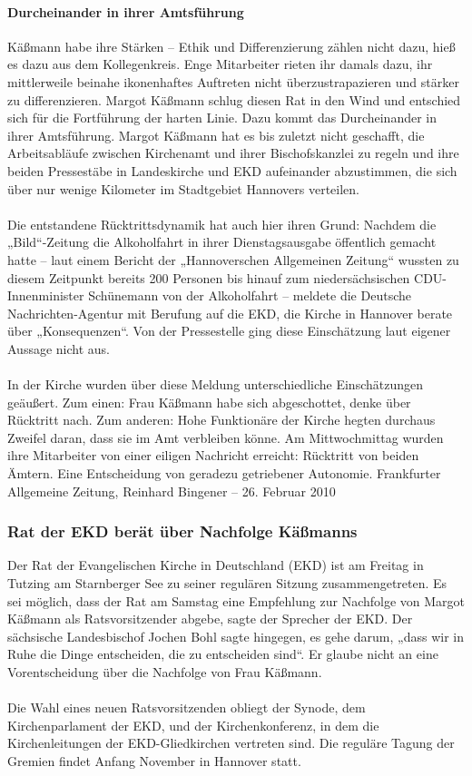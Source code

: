 \documentclass[a4paper,12pt,twoside]{scrbook}
\begin{document}
\paragraph{Durcheinander in ihrer Amtsführung}
Käßmann habe ihre Stärken – Ethik und Differenzierung zählen nicht dazu, hieß es dazu aus dem Kollegenkreis. Enge Mitarbeiter rieten ihr damals dazu, ihr mittlerweile beinahe ikonenhaftes Auftreten nicht überzustrapazieren und stärker zu differenzieren. Margot Käßmann schlug diesen Rat in den Wind und entschied sich für die Fortführung der harten Linie. Dazu kommt das Durcheinander in ihrer Amtsführung. Margot Käßmann hat es bis zuletzt nicht geschafft, die Arbeitsabläufe zwischen Kirchenamt und ihrer Bischofskanzlei zu regeln und ihre beiden Pressestäbe in Landeskirche und EKD aufeinander abzustimmen, die sich über nur wenige Kilometer im Stadtgebiet Hannovers verteilen.
\\\\
Die entstandene Rücktrittsdynamik hat auch hier ihren Grund: Nachdem die „Bild“-Zeitung die Alkoholfahrt in ihrer Dienstagsausgabe öffentlich gemacht hatte – laut einem Bericht der „Hannoverschen Allgemeinen Zeitung“ wussten zu diesem Zeitpunkt bereits 200 Personen bis hinauf zum niedersächsischen CDU-Innenminister Schünemann von der Alkoholfahrt – meldete die Deutsche Nachrichten-Agentur mit Berufung auf die EKD, die Kirche in Hannover berate über „Konsequenzen“. Von der Pressestelle ging diese Einschätzung laut eigener Aussage nicht aus.
\\\\
In der Kirche wurden über diese Meldung unterschiedliche Einschätzungen geäußert. Zum einen: Frau Käßmann habe sich abgeschottet, denke über Rücktritt nach. Zum anderen: Hohe Funktionäre der Kirche hegten durchaus Zweifel daran, dass sie im Amt verbleiben könne. Am Mittwochmittag wurden ihre Mitarbeiter von einer eiligen Nachricht erreicht: Rücktritt von beiden Ämtern. Eine Entscheidung von geradezu getriebener Autonomie.
\newpage
Frankfurter Allgemeine Zeitung, Reinhard Bingener \hfill -- \hfill 26. Februar 2010
\subsubsection{Rat der EKD berät über Nachfolge Käßmanns}
Der Rat der Evangelischen Kirche in Deutschland (EKD) ist am Freitag in Tutzing am Starnberger See zu seiner regulären Sitzung zusammengetreten. Es sei möglich, dass der Rat am Samstag eine Empfehlung zur Nachfolge von Margot Käßmann als Ratsvorsitzender abgebe, sagte der Sprecher der EKD. Der sächsische Landesbischof Jochen Bohl sagte hingegen, es gehe darum, „dass wir in Ruhe die Dinge entscheiden, die zu entscheiden sind“. Er glaube nicht an eine Vorentscheidung über die Nachfolge von Frau Käßmann.
\\\\
Die Wahl eines neuen Ratsvorsitzenden obliegt der Synode, dem Kirchenparlament der EKD, und der Kirchenkonferenz, in dem die Kirchenleitungen der EKD-Gliedkirchen vertreten sind. Die reguläre Tagung der Gremien findet Anfang November in Hannover statt.
\end{document}
